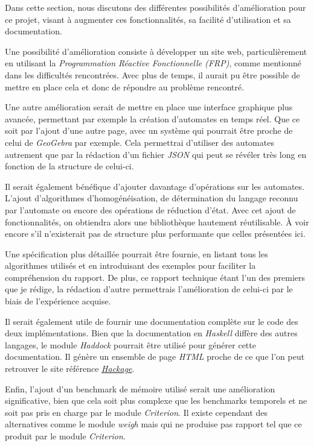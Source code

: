 Dans cette section, nous discutons des différentes possibilités d'amélioration 
pour ce projet, visant à augmenter ces fonctionnalités, sa facilité 
d'utilisation et sa documentation.

Une possibilité d'amélioration consiste à développer un site web, 
particulièrement en utilisant la \textit{Programmation Réactive Fonctionnelle 
(FRP)}, comme mentionné dans les difficultés rencontrées. Avec plus de temps, il
aurait pu être possible de mettre en place cela et donc de répondre au problème 
rencontré.

\vphantom{}

Une autre amélioration serait de mettre en place une interface graphique plus 
avancée, permettant par exemple la création d'automates en temps réel. Que ce 
soit par l'ajout d'une autre page, avec un système qui pourrait être proche de 
celui de \textit{GeoGebra} par exemple. Cela permettrai d'utiliser des automates 
autrement que par la rédaction d'un fichier \textit{JSON} qui peut se révéler 
très long en fonction de la structure de celui-ci.   

\phantom{}

Il serait également bénéfique d'ajouter davantage d'opérations sur les 
automates. L'ajout d'algorithmes d'homogénéisation, de détermination du langage 
reconnu par l'automate ou encore des opérations de réduction d'état. Avec cet 
ajout de fonctionnalités, on obtiendra alors une bibliothèque hautement 
réutilisable. À voir encore s'il n'existerait pas de structure plus performante 
que celles présentées ici.

\vphantom{}

Une spécification plus détaillée pourrait être fournie, en listant tous les 
algorithmes utilisés et en introduisant des exemples pour faciliter la 
compréhension du rapport. De plus, ce rapport technique étant l'un des premiers 
que je rédige, la rédaction d'autre permettrais l'amélioration de celui-ci par 
le biais de l'expérience acquise.

\vphantom{}

Il serait également utile de fournir une documentation complète sur le code des 
deux implémentations. Bien que la documentation en \textit{Haskell} diffère des 
autres langages, le module \textit{Haddock} pourrait être utilisé pour générer 
cette documentation. Il génère un ensemble de page \textit{HTML} proche de ce 
que l'on peut retrouver le site référence
\href{https://hackage.haskell.org/}{\textit{Hackage}}.

\vphantom{}

Enfin, l'ajout d'un benchmark de mémoire utilisé serait une amélioration 
significative, bien que cela soit plus complexe que les benchmarks temporels et 
ne soit pas pris en charge par le module \textit{Criterion}. Il existe cependant 
des alternatives comme le module \textit{weigh} mais qui ne produise pas rapport 
tel que ce produit par le module \textit{Criterion}. 
